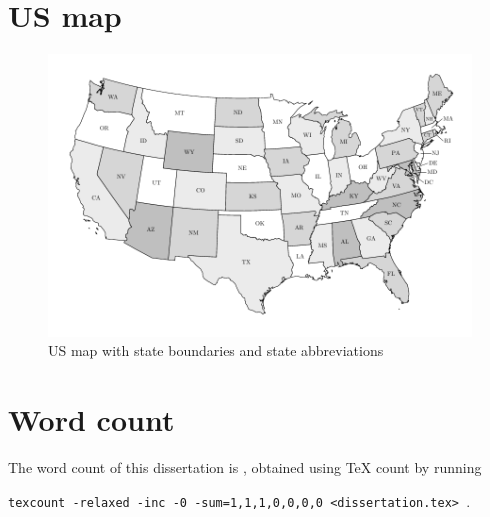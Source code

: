 \section{US map} \label{sec:notes_us_map}
%
\vspace*{-0.8cm}
\begin{figure}[H]
	\centering
	\includegraphics[scale=0.6,draft=false]{../../results/us_migration/us_migration_map_state_names.pdf}
	\vspace*{-0.5cm}
	\caption{US map with state boundaries and state abbreviations}
	\label{fig:notes_us_map} 
\end{figure}







\section{Word count}

The word count of this dissertation is \unskip, obtained using \TeX \hspace*{-0.15cm} count by running
%
\begin{center}
	\texttt{texcount -relaxed -inc -0 -sum=1,1,1,0,0,0,0 <dissertation.tex>\,}.
\end{center}
%













